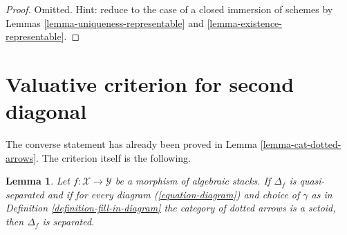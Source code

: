\documentclass{stacks-project}
\theoremstyle{plain}
\newtheorem{lemma}[subsection]{Lemma}
\theoremstyle{definition}
\theoremstyle{remark}
\numberwithin{equation}{subsection}
\begin{document}
\begin{proof}
Omitted. Hint: reduce to the case of a closed immersion of
schemes by Lemmas \ref{lemma-uniqueness-representable} and
\ref{lemma-existence-representable}.
\end{proof}





\section{Valuative criterion for second diagonal}
\label{section-valuative-second}

\noindent
The converse statement has already been proved in
Lemma \ref{lemma-cat-dotted-arrows}.
The criterion itself is the following.

\begin{lemma}
\label{lemma-setoids-and-diagonal}
Let $f : \mathcal{X} \to \mathcal{Y}$ be a morphism of algebraic stacks.
If $\Delta_f$ is quasi-separated and if for every diagram
(\ref{equation-diagram}) and choice of $\gamma$ as in
Definition \ref{definition-fill-in-diagram}
the category of dotted arrows
is a setoid, then $\Delta_f$ is separated.
\end{lemma}
\end{document}
